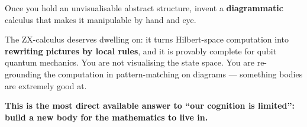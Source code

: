 \begin{movebox}[title={MOVE 3 --- Re-ground with a new pictorial calculus \normalfont\itshape(the highest-yield move in the history of this problem)}]
Once you hold an unvisualisable abstract structure, invent a \textbf{diagrammatic} calculus that
makes it manipulable by hand and eye.
\begin{center}
\end{center}
\vspace{2pt}
The ZX-calculus deserves dwelling on: it turns Hilbert-space computation into \textbf{rewriting
pictures by local rules}, and it is provably complete for qubit quantum mechanics. You are not
visualising the state space. You are re-grounding the computation in pattern-matching on diagrams ---
something bodies are extremely good at.

\textbf{This is the most direct available answer to ``our cognition is limited'': build a new body for
the mathematics to live in.}
\end{movebox}

